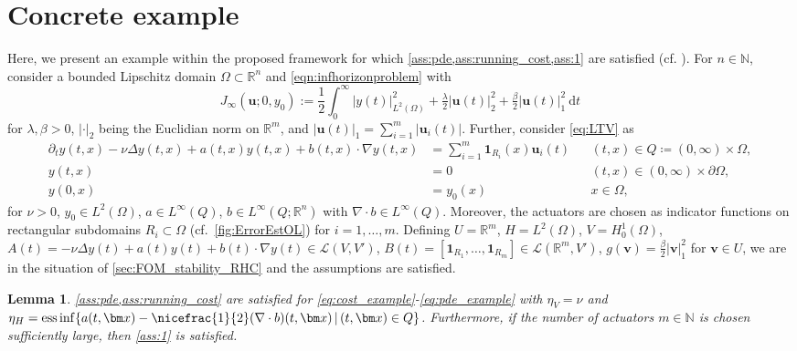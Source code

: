 \documentclass{m2an}
\newcommand{\bx}{{\bm x}}
\newcommand{\N}{\mathbb N}
\def\R{\mathbb{R}}
\newcommand{\bu}{\mathbf{u}}
\newcommand{\bv}{\mathbf{v}}
\newcommand{\dt}{\mathrm{d}t}
\DeclareMathOperator*{\essinf}{ess\,inf}
\newcommand{\calL}{\mathcal{L}}
\newcommand{\norm}[2]{\left|#1\right|_{#2}}
\newtheorem{lemma}[thrm]{Lemma}
\begin{document}
\section{Concrete example}\label{sec:example}
%
Here, we present an example within the proposed framework for which \cref{ass:pde,ass:running_cost,ass:1} are satisfied (cf. \cite{azmi2019hybrid}). For $n\in \N$, consider a bounded Lipschitz domain $\Omega\subset\R^n$ and \eqref{eqn:infhorizonproblem} with
%
\begin{equation}
\label{eq:cost_example}
J_{\infty}(\mathbf{u};0,y_0):= \frac{1}{2}\int_{0}^{\infty}\norm{y(t)}{L^2(\Omega)}^2+\tfrac{\lambda}{2} |\mathbf{u}(t)|^2_{2}+\tfrac{\beta}{2} |\mathbf{u}(t)|^2_{1}\ \dt
\end{equation}
%
for $\lambda,\beta >0$, $\norm{\cdot}{2}$ being the Euclidian norm on $\R^m$, and $|\mathbf{u}(t)|_{1}=\sum_{i=1}^m|\bu_i(t)|$.             
Further, consider \eqref{eq:LTV} as
%
{\begin{equation}
    \label{eq:pde_example}
    \begin{aligned}
        \partial_t y(t,x)-\nu\Delta y(t,x) + a(t,x)y(t,x)+ b(t,x) \cdot \nabla y(t,x)&=\textstyle \sum\limits^m_{i =1} \mathbf{1}_{R_i}(x)\bu_i(t)&& (t,x)\in Q\coloneqq(0,\infty)\times\Omega,\\
          y(t,x)&=0&&(t,x)\in (0,\infty)\times \partial \Omega,\\
        y(0,x)&=y_0(x)&& x\in  \Omega,
    \end{aligned}
\end{equation}}
%
for $\nu>0$, $y_0\in L^2(\Omega)$, $a\in L^\infty(Q)$, $b\in L^\infty(Q; \R^n) $ with $\nabla\cdot b\in L^\infty(Q) $. Moreover, the actuators are chosen as indicator functions on rectangular subdomains \( R_i \subset \Omega \) (cf.~\cref{fig:ErrorEstOL}) for $i=1,\ldots,m$. 
Defining $U=\R^m$, $H=L^2(\Omega)$, $V=H_0^1(\Omega)$, {$A(t)=-\nu\Delta y(t) + a(t)y(t)+ b(t)\cdot\nabla y(t)\in \calL(V,V')$}, $B(t)=[\mathbf{1}_{R_1}, \ldots,\mathbf{1}_{R_m}]\in \calL(\R^m,V')$, $g(\bv)=\tfrac{\beta}{2} |\bv|^2_{1}$ for $\bv\in U$, we are in the situation of \cref{sec:FOM_stability_RHC} and the assumptions are satisfied.
%
\begin{lemma}
     \cref{ass:pde,ass:running_cost} are satisfied for \eqref{eq:cost_example}-\eqref{eq:pde_example} with $\eta_V = \nu$ and $\eta_H=\essinf\{a(t,\bx)-\nicefrac{1}{2}(\nabla \cdot b)(t,\bx)\,|\,(t,\bx)\in Q\}$. Furthermore, if the number of actuators $m\in\N$ is chosen sufficiently large, then \cref{ass:1} is satisfied.
\end{lemma}
\end{document}

